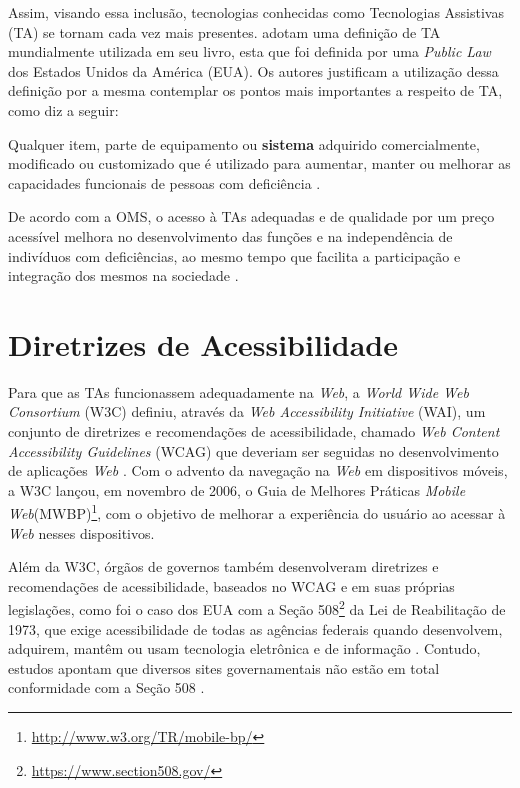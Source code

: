 Assim, visando essa inclusão, tecnologias conhecidas como Tecnologias Assistivas (TA) se tornam cada vez mais presentes.
 adotam uma definição de TA mundialmente utilizada em seu livro, esta que foi definida por uma \textit{Public Law}
dos Estados Unidos da América (EUA). Os autores justificam a utilização dessa definição por a mesma contemplar os pontos mais
importantes a respeito de TA, como diz a seguir:

\begin{citacao}
    Qualquer item, parte de equipamento ou \textbf{sistema} adquirido comercialmente, modificado ou customizado que é utilizado para aumentar, manter ou melhorar as capacidades
    funcionais de pessoas com deficiência \cite{Cook2014}.
\end{citacao}

De acordo com a OMS, o acesso à TAs adequadas e de qualidade por um preço acessível melhora
no desenvolvimento das funções e na independência de indivíduos com deficiências, ao mesmo tempo que facilita
a participação e integração dos mesmos na sociedade \cite{world2019global}.

\section{Diretrizes de Acessibilidade}

Para que as TAs funcionassem adequadamente na \textit{Web}, a \textit{World Wide Web Consortium} (W3C) definiu, através da
\emph{Web Accessibility Initiative} (WAI), um conjunto de diretrizes e recomendações de acessibilidade, chamado
\emph{Web Content Accessibility Guidelines} (WCAG) que deveriam ser seguidas no desenvolvimento de aplicações \emph{Web}
\cite{W3C2019}. Com o advento da navegação na \emph{Web} em dispositivos móveis, a W3C lançou, em novembro
de 2006, o Guia de Melhores Práticas \emph{Mobile Web}(MWBP)\footnote{\url{http://www.w3.org/TR/mobile-bp/}}, com o objetivo de
melhorar a experiência do usuário ao acessar à \emph{Web} nesses dispositivos.

Além da W3C, órgãos de governos também desenvolveram diretrizes e recomendações de acessibilidade, baseados no WCAG e
em suas próprias legislações, como foi o caso dos EUA com a Seção 508\footnote{\url{https://www.section508.gov/}}
da Lei de Reabilitação de 1973, que exige acessibilidade de todas as agências federais quando desenvolvem,
adquirem, mantêm ou usam tecnologia eletrônica e de informação \cite{JAEGER2006169}. Contudo, estudos apontam que diversos
sites governamentais não estão em total conformidade com a Seção 508 \cite{KING2016715,YI201575}.

